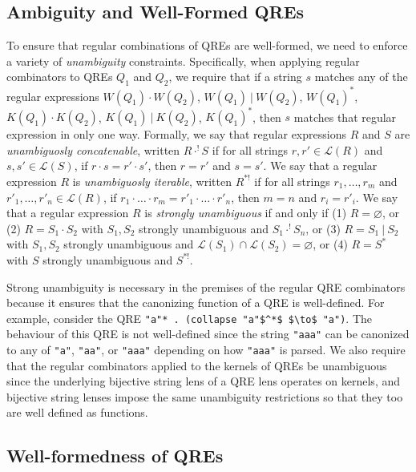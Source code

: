 \documentclass[acmsmall,review,anonymous]{acmart}
\newcommand{\sep}{\ensuremath{\ | \ }}
\newcommand{\cd}[1]{\lstinline[backgroundcolor=\color{white}]$#1$}
\begin{document}
\subsection{Ambiguity and Well-Formed QREs}
\label{subsec:well-formed-qres}

To ensure that regular combinations of QREs are well-formed, we need
to enforce a variety of {\em unambiguity} constraints.  
Specifically, when applying regular combinators to QREs $Q_1$ and $Q_2$, we require that
if a string $s$ matches any of the regular expressions $W(Q_1) \cdot W(Q_2)$,
\quad $W(Q_1) \sep W(Q_2)$, \quad $W(Q_1)^*$, \quad $K(Q_1) \cdot K(Q_2)$,
\quad $K(Q_1) \sep K(Q_2)$, \quad $K(Q_1)^*$, then $s$ matches that regular
expression in only one way.
Formally, we say that regular expressions $R$ and $S$ are
\textit{unambiguosly concatenable}, written $R \cdot^! S$ if for all strings
$r, r' \in \mathcal{L}(R)$ and $s, s' \in \mathcal{L}(S)$, if $r \cdot s = r'
\cdot s'$, then $r = r'$ and $s = s'$. We say that a regular expression $R$ is
\textit{unambiguosly iterable}, written $R^{*!}$ if for all strings $r_1,
\ldots, r_m$ and $r'_1, \ldots, r'_n \in \mathcal{L}(R)$, if $r_1 \cdot \ldots
\cdot r_m = r'_1 \cdot \ldots \cdot r'_n$, then $m = n$ and $r_i = r'_i$. We say
that a regular expression $R$ is \textit{strongly unambiguous}\cite{Sippu1988}
if and only if (1) $R = \varnothing$, or (2) $R = S_1 \cdot S_2$ with $S_1,
S_2$ strongly unambiguous and $S_1 \cdot^! S_n$, or (3) $R = S_1 \sep S_2$ with
$S_1, S_2$ strongly unambiguous and $\mathcal{L}(S_1) \cap \mathcal{L}(S_2) =
\varnothing$, or (4) $R = S^*$ with $S$ strongly unambiguous and $S^{*!}$.

Strong unambiguity is necessary in the premises of the regular QRE combinators
because it ensures that the canonizing function of a QRE is well-defined.
For example, consider the QRE \lstinline{"a"* . (collapse "a"$^*$ $\to$ "a")}. The
behaviour of this QRE is not well-defined since the string
\cd{"aaa"} can be canonized to any of \cd{"a"}, \cd{"aa"}, or \cd{"aaa"}
depending on how \cd{"aaa"} is parsed. We also require that the regular
combinators applied to the kernels of QREs be unambiguous since the underlying
bijective string lens of a QRE lens operates on kernels, and bijective string lenses
impose the same unambiguity restrictions so that they too are well defined as
functions.

\subsection{Well-formedness of QREs}
\end{document}
